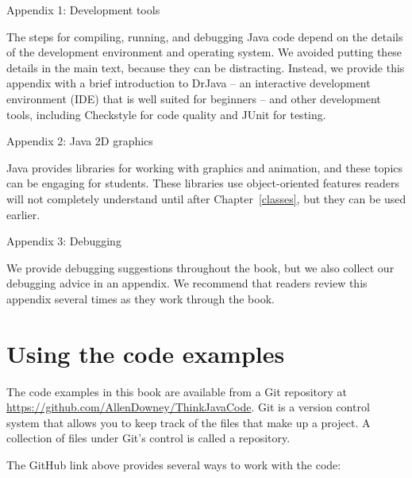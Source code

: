\documentclass[12pt]{book}
\theoremstyle{exercise}
\begin{document}
\begin{description}

\item{Appendix 1: Development tools}

The steps for compiling, running, and debugging Java code depend on the details of the development environment and operating system.
We avoided putting these details in the main text, because they can be distracting.
Instead, we provide this appendix with a brief introduction to DrJava -- an interactive development environment (IDE) that is well suited for beginners -- and other development tools, including Checkstyle for code quality and JUnit for testing.

\item{Appendix 2: Java 2D graphics}

Java provides libraries for working with graphics and animation, and these topics can be engaging for students.
These libraries use object-oriented features readers will not completely understand until after Chapter~\ref{classes}, but they can be used earlier.

\item{Appendix 3: Debugging}

We provide debugging suggestions throughout the book, but we also collect our debugging advice in an appendix.
We recommend that readers review this appendix several times as they work through the book.

\end{description}


\section*{Using the code examples}
\label{code}

The code examples in this book are available from a Git repository at \url{https://github.com/AllenDowney/ThinkJavaCode}.
Git is a version control system that allows you to keep track of the files that make up a project.
A collection of files under Git's control is called a repository.


The GitHub link above provides several ways to work with the code:
\end{document}
